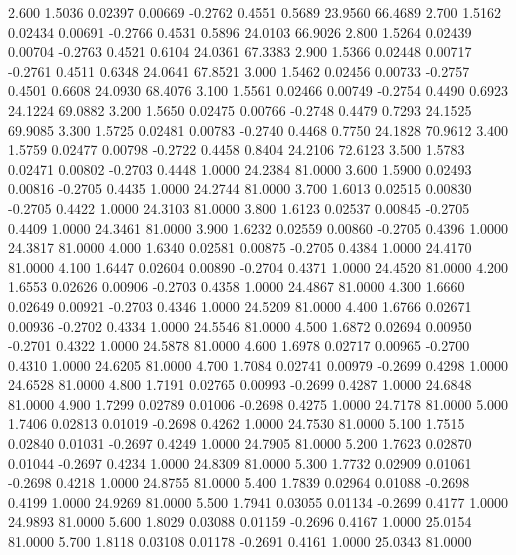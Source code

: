    2.600   1.5036   0.02397   0.00669  -0.2762   0.4551   0.5689  23.9560  66.4689
   2.700   1.5162   0.02434   0.00691  -0.2766   0.4531   0.5896  24.0103  66.9026
   2.800   1.5264   0.02439   0.00704  -0.2763   0.4521   0.6104  24.0361  67.3383
   2.900   1.5366   0.02448   0.00717  -0.2761   0.4511   0.6348  24.0641  67.8521
   3.000   1.5462   0.02456   0.00733  -0.2757   0.4501   0.6608  24.0930  68.4076
   3.100   1.5561   0.02466   0.00749  -0.2754   0.4490   0.6923  24.1224  69.0882
   3.200   1.5650   0.02475   0.00766  -0.2748   0.4479   0.7293  24.1525  69.9085
   3.300   1.5725   0.02481   0.00783  -0.2740   0.4468   0.7750  24.1828  70.9612
   3.400   1.5759   0.02477   0.00798  -0.2722   0.4458   0.8404  24.2106  72.6123
   3.500   1.5783   0.02471   0.00802  -0.2703   0.4448   1.0000  24.2384  81.0000
   3.600   1.5900   0.02493   0.00816  -0.2705   0.4435   1.0000  24.2744  81.0000
   3.700   1.6013   0.02515   0.00830  -0.2705   0.4422   1.0000  24.3103  81.0000
   3.800   1.6123   0.02537   0.00845  -0.2705   0.4409   1.0000  24.3461  81.0000
   3.900   1.6232   0.02559   0.00860  -0.2705   0.4396   1.0000  24.3817  81.0000
   4.000   1.6340   0.02581   0.00875  -0.2705   0.4384   1.0000  24.4170  81.0000
   4.100   1.6447   0.02604   0.00890  -0.2704   0.4371   1.0000  24.4520  81.0000
   4.200   1.6553   0.02626   0.00906  -0.2703   0.4358   1.0000  24.4867  81.0000
   4.300   1.6660   0.02649   0.00921  -0.2703   0.4346   1.0000  24.5209  81.0000
   4.400   1.6766   0.02671   0.00936  -0.2702   0.4334   1.0000  24.5546  81.0000
   4.500   1.6872   0.02694   0.00950  -0.2701   0.4322   1.0000  24.5878  81.0000
   4.600   1.6978   0.02717   0.00965  -0.2700   0.4310   1.0000  24.6205  81.0000
   4.700   1.7084   0.02741   0.00979  -0.2699   0.4298   1.0000  24.6528  81.0000
   4.800   1.7191   0.02765   0.00993  -0.2699   0.4287   1.0000  24.6848  81.0000
   4.900   1.7299   0.02789   0.01006  -0.2698   0.4275   1.0000  24.7178  81.0000
   5.000   1.7406   0.02813   0.01019  -0.2698   0.4262   1.0000  24.7530  81.0000
   5.100   1.7515   0.02840   0.01031  -0.2697   0.4249   1.0000  24.7905  81.0000
   5.200   1.7623   0.02870   0.01044  -0.2697   0.4234   1.0000  24.8309  81.0000
   5.300   1.7732   0.02909   0.01061  -0.2698   0.4218   1.0000  24.8755  81.0000
   5.400   1.7839   0.02964   0.01088  -0.2698   0.4199   1.0000  24.9269  81.0000
   5.500   1.7941   0.03055   0.01134  -0.2699   0.4177   1.0000  24.9893  81.0000
   5.600   1.8029   0.03088   0.01159  -0.2696   0.4167   1.0000  25.0154  81.0000
   5.700   1.8118   0.03108   0.01178  -0.2691   0.4161   1.0000  25.0343  81.0000

